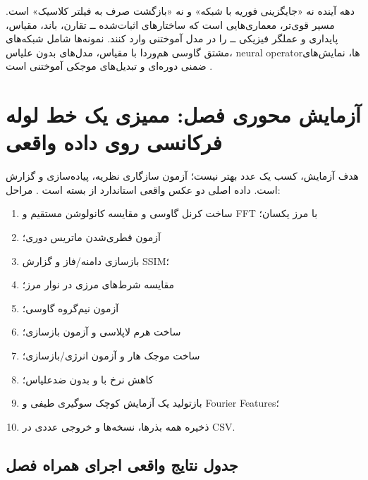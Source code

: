 \documentclass[12pt,openany,oneside]{book}
\begin{document}
\begin{futurebox}
دهه آینده نه «جایگزینی فوریه با شبکه» و نه «بازگشت صرف به فیلتر کلاسیک» است. مسیر قوی‌تر، معماری‌هایی
است که ساختارهای اثبات‌شده ــ تقارن، باند، مقیاس، پایداری و عملگر فیزیکی ــ را در مدل آموختنی وارد کنند.
نمونه‌ها شامل شبکه‌های مشتق گاوسی هم‌وردا با مقیاس، مدل‌های بدون علیاس، neural operatorها، نمایش‌های ضمنی
دوره‌ای و تبدیل‌های موجکی آموختنی است \cite{lindeberg2020scale,karras2021aliasfree,li2021fno,sitzmann2020siren}.
\end{futurebox}

\section{آزمایش محوری فصل: ممیزی یک خط لوله فرکانسی روی داده واقعی}

هدف آزمایش، کسب یک عدد بهتر نیست؛ آزمون سازگاری نظریه، پیاده‌سازی و گزارش است. داده اصلی دو عکس واقعی
استاندارد از بسته  است \cite{vanderwalt2014skimage}. مراحل:
\begin{enumerate}
\item ساخت کرنل گاوسی و مقایسه کانولوشن مستقیم و FFT با مرز یکسان؛
\item آزمون قطری‌شدن ماتریس دوری؛
\item بازسازی دامنه/فاز و گزارش SSIM؛
\item مقایسه شرط‌های مرزی در نوار مرز؛
\item آزمون نیم‌گروه گاوسی؛
\item ساخت هرم لاپلاسی و آزمون بازسازی؛
\item ساخت موجک هار و آزمون انرژی/بازسازی؛
\item کاهش نرخ با و بدون ضدعلیاس؛
\item بازتولید یک آزمایش کوچک سوگیری طیفی و Fourier Features؛
\item ذخیره همه بذرها، نسخه‌ها و خروجی عددی در CSV.
\end{enumerate}

\subsection{جدول نتایج واقعی اجرای همراه فصل}
\end{document}
